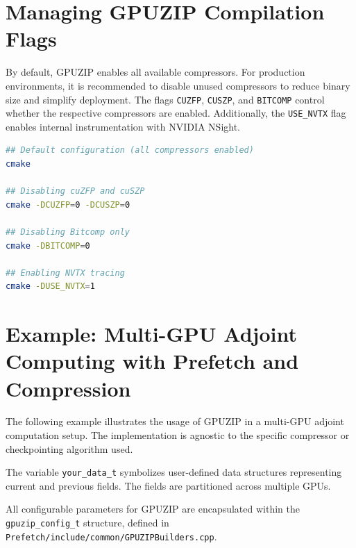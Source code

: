 \documentclass[Ingles]{ic-tese-v3}
\begin{document}
\section{Managing GPUZIP Compilation Flags}

By default, GPUZIP enables all available compressors. For production environments, it is recommended to disable unused compressors to reduce binary size and simplify deployment. The flags \texttt{CUZFP}, \texttt{CUSZP}, and \texttt{BITCOMP} control whether the respective compressors are enabled. Additionally, the \texttt{USE\_NVTX} flag enables internal instrumentation with NVIDIA NSight.

\begin{lstlisting}[language=bash, caption={Example of CMake flags usage}, label={lst:cmakeflags}]
## Default configuration (all compressors enabled)
cmake 

## Disabling cuZFP and cuSZP
cmake -DCUZFP=0 -DCUSZP=0

## Disabling Bitcomp only
cmake -DBITCOMP=0

## Enabling NVTX tracing
cmake -DUSE_NVTX=1
\end{lstlisting}

\section{Example: Multi-GPU Adjoint Computing with Prefetch and Compression}

The following example illustrates the usage of GPUZIP in a multi-GPU adjoint computation setup. The implementation is agnostic to the specific compressor or checkpointing algorithm used.

The variable \texttt{your\_data\_t} symbolizes user-defined data structures representing current and previous fields. The fields are partitioned across multiple GPUs.

All configurable parameters for GPUZIP are encapsulated within the \texttt{gpuzip\_config\_t} structure, defined in \texttt{Prefetch/include/common/GPUZIPBuilders.cpp}.
\end{document}

